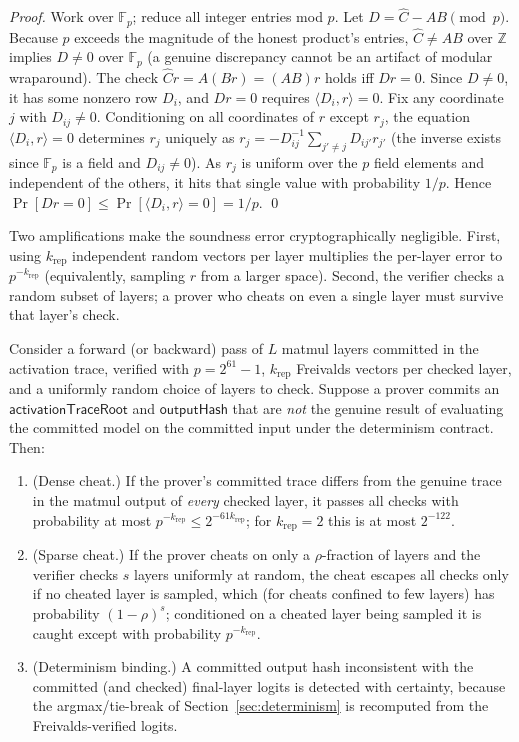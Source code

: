 \begin{proof}
Work over $\mathbb{F}_p$; reduce all integer entries mod $p$. Let
$D = \hat C - AB \pmod p$. Because $p$ exceeds the magnitude of the honest product's
entries, $\hat C \ne AB$ over $\mathbb{Z}$ implies $D \ne 0$ over $\mathbb{F}_p$
(a genuine discrepancy cannot be an artifact of modular wraparound). The check
$\hat C r = A(Br) = (AB)r$ holds iff $D r = 0$. Since $D \ne 0$, it has some nonzero
row $D_i$, and $D r = 0$ requires $\langle D_i, r\rangle = 0$. Fix any coordinate $j$
with $D_{ij} \ne 0$. Conditioning on all coordinates of $r$ except $r_j$, the
equation $\langle D_i, r\rangle = 0$ determines $r_j$ uniquely as
$r_j = -D_{ij}^{-1}\sum_{j'\ne j} D_{ij'} r_{j'}$ (the inverse exists since
$\mathbb{F}_p$ is a field and $D_{ij}\ne 0$). As $r_j$ is uniform over the $p$ field
elements and independent of the others, it hits that single value with probability
$1/p$. Hence $\Pr[Dr=0] \le \Pr[\langle D_i, r\rangle = 0] = 1/p$. \qed
\end{proof}

Two amplifications make the soundness error cryptographically negligible. First,
using $k_{\mathrm{rep}}$ independent random vectors per layer multiplies the per-layer
error to $p^{-k_{\mathrm{rep}}}$ (equivalently, sampling $r$ from a larger space).
Second, the verifier checks a random subset of layers; a prover who cheats on even a
single layer must survive that layer's check.

\begin{theorem}
\label{thm:soundness}
Consider a forward (or backward) pass of $L$ matmul layers committed in the
activation trace, verified with $p = 2^{61}-1$, $k_{\mathrm{rep}}$ Freivalds vectors
per checked layer, and a uniformly random choice of layers to check. Suppose a
prover commits an $\mathsf{activationTraceRoot}$ and $\mathsf{outputHash}$ that are
\emph{not} the genuine result of evaluating the committed model on the committed
input under the determinism contract. Then:
\begin{enumerate}[leftmargin=1.6em]
\item \textup{(Dense cheat.)} If the prover's committed trace differs from the
genuine trace in the matmul output of \emph{every} checked layer, it passes all
checks with probability at most $p^{-k_{\mathrm{rep}}} \le 2^{-61 k_{\mathrm{rep}}}$;
for $k_{\mathrm{rep}}=2$ this is at most $2^{-122}$.
\item \textup{(Sparse cheat.)} If the prover cheats on only a $\rho$-fraction of
layers and the verifier checks $s$ layers uniformly at random, the cheat escapes all
checks only if no cheated layer is sampled, which (for cheats confined to few layers)
has probability $(1-\rho)^s$; conditioned on a cheated layer being sampled it is
caught except with probability $p^{-k_{\mathrm{rep}}}$.
\item \textup{(Determinism binding.)} A committed output hash inconsistent with the
committed (and checked) final-layer logits is detected with certainty, because the
argmax/tie-break of Section~\ref{sec:determinism} is recomputed from the
Freivalds-verified logits.
\end{enumerate}
\end{theorem}

